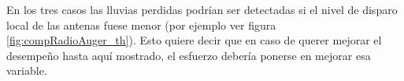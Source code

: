 	En los tres casos las lluvias perdidas podr\'ian ser detectadas si el nivel de disparo local de las antenas fuese menor (por ejemplo ver figura \ref{fig:compRadioAuger_th}). 
	Esto quiere decir que en caso de querer mejorar el desempe\~no hasta aqu\'i mostrado, el esfuerzo deber\'ia ponerse en mejorar esa variable.  
	
	

	

	